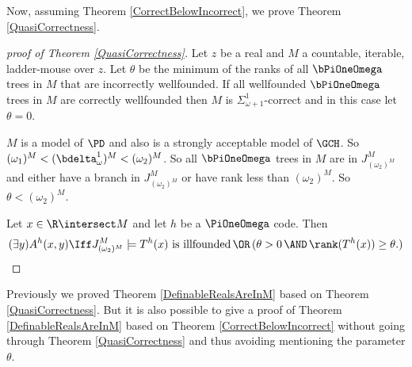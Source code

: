 \documentclass[oneside,12pt]{amsart}
\begin{document}
Now, assuming Theorem \ref{CorrectBelowIncorrect}, we prove Theorem
\ref{QuasiCorrectness}.

\begin{proof}[proof of Theorem \ref{QuasiCorrectness}]
Let $z$ be a real and $M$ a countable, iterable, ladder-mouse over $z$.
Let $\theta$ be the minimum of the ranks of all
$\bPiOneOmega$ trees in $M$ that are  incorrectly wellfounded.
If all wellfounded $\bPiOneOmega$ trees in $M$ are correctly wellfounded
then $M$ is $\Sigma^1_{\omega+1}$-correct and in this case let $\theta=0$.

$M$ is a model of $\PD$ and also is a strongly acceptable model of $\GCH$.
So $(\omega_1)^M<(\bdelta^1_{\omega})^M < (\omega_2)^M$.
So all $\bPiOneOmega$ trees in $M$ are in $J^M_{(\omega_2)^M}$ and either have a branch
in $J^M_{(\omega_2)^M}$ or have rank less than $(\omega_2)^M$.
So $\theta < (\omega_2)^M$.


Let $x\in\R\intersect M$ and let $h$ be a
$\PiOneOmega$ code. Then
$$(\exists y) A^h(x,y) \Iff J^M_{(\omega_2)^M}\models T^h(x) \text{ is illfounded} \,\OR\, (\theta>0 \,\AND\, \rank(T^h(x)) \geq \theta.)$$
\end{proof}

Previously we proved Theorem \ref{DefinableRealsAreInM} based on
Theorem \ref{QuasiCorrectness}. But it is also possible to give a proof
of Theorem \ref{DefinableRealsAreInM} based on Theorem \ref{CorrectBelowIncorrect}
without going through Theorem \ref{QuasiCorrectness} and thus avoiding
mentioning the parameter $\theta$.
\end{document}
